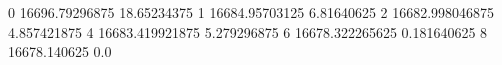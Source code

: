 0 16696.79296875 18.65234375
1 16684.95703125 6.81640625
2 16682.998046875 4.857421875
4 16683.419921875 5.279296875
6 16678.322265625 0.181640625
8 16678.140625 0.0
